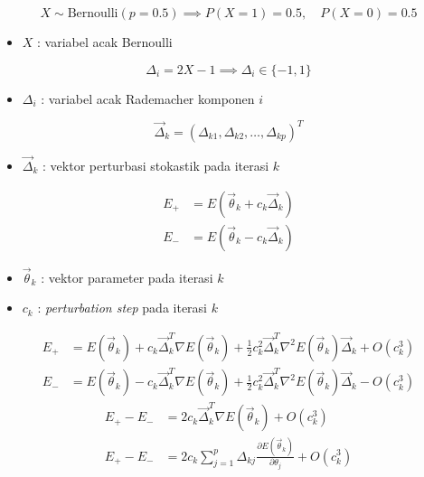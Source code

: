 \begin{equation}
    X \sim \text{Bernoulli}(p=0.5) \implies P(X=1) = 0.5, \quad P(X=0) = 0.5
\end{equation}
\begin{itemize}
    \item $X$ : variabel acak Bernoulli
\end{itemize}

\begin{equation}
    \Delta_i = 2X - 1 \implies \Delta_i \in \{-1, 1\}
\end{equation}
\begin{itemize}
    \item $\Delta_{i}$ : variabel acak Rademacher komponen $i$
\end{itemize}

\begin{equation}
    \vec{\Delta}_k = (\Delta_{k1}, \Delta_{k2}, \dots, \Delta_{kp})^T
\end{equation}
\begin{itemize}
    \item $\vec{\Delta}_k$ : vektor perturbasi stokastik pada iterasi $k$
\end{itemize}

\begin{align}
    E_+ &= E(\vec{\theta}_k + c_k \vec{\Delta}_k) \\
    E_- &= E(\vec{\theta}_k - c_k \vec{\Delta}_k)
\end{align}
\begin{itemize}
    \item $\vec{\theta}_k$ : vektor parameter pada iterasi $k$
    \item $c_k$ : \textit{perturbation step} pada iterasi $k$
\end{itemize}

\begin{align}
    E_+ &= E(\vec{\theta}_k) + c_k \vec{\Delta}_k^T \nabla E(\vec{\theta}_k) + \frac{1}{2} c_k^2 \vec{\Delta}_k^T \nabla^2 E(\vec{\theta}_k) \vec{\Delta}_k + O(c_k^3) \\
    E_- &= E(\vec{\theta}_k) - c_k \vec{\Delta}_k^T \nabla E(\vec{\theta}_k) + \frac{1}{2} c_k^2 \vec{\Delta}_k^T \nabla^2 E(\vec{\theta}_k) \vec{\Delta}_k - O(c_k^3)
\end{align}
\begin{align}
    E_+ - E_- &= 2 c_k \vec{\Delta}_k^T \nabla E(\vec{\theta}_k) + O(c_k^3) \\
    E_+ - E_- &= 2 c_k \sum_{j=1}^p \Delta_{kj} \frac{\partial E(\vec{\theta}_k)}{\partial \theta_j} + O(c_k^3)
\end{align}

